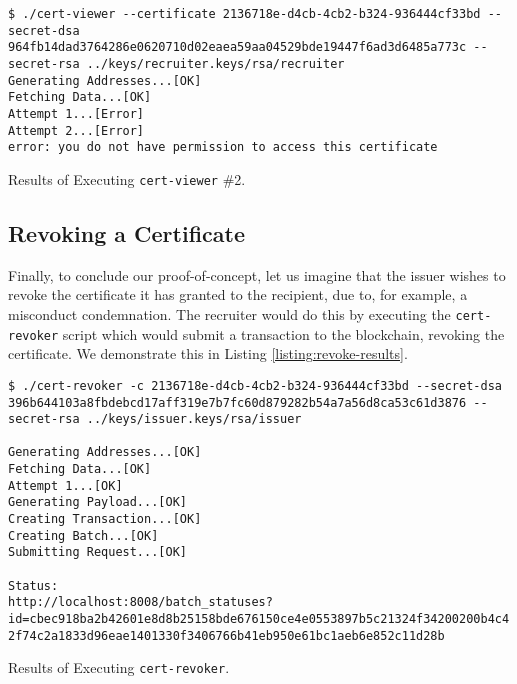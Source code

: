 \begin{listing}[ht]
	\begin{verbatim}
$ ./cert-viewer --certificate 2136718e-d4cb-4cb2-b324-936444cf33bd --secret-dsa 964fb14dad3764286e0620710d02eaea59aa04529bde19447f6ad3d6485a773c --secret-rsa ../keys/recruiter.keys/rsa/recruiter
Generating Addresses...[OK]
Fetching Data...[OK]
Attempt 1...[Error]
Attempt 2...[Error]
error: you do not have permission to access this certificate
\end{verbatim}
	\caption{Results of Executing \texttt{cert-viewer} \#2.}
	\label{listing:view-recruiter-revoke-results}
\end{listing}

\subsection{Revoking a Certificate}
\label{sec:impl-revoke}

Finally, to conclude our proof-of-concept, let us imagine that the issuer wishes to revoke the certificate it has granted to the recipient, due to, for example, a misconduct condemnation. The recruiter would do this by executing the \texttt{cert-revoker} script which would submit a transaction to the blockchain, revoking the certificate. We demonstrate this in Listing \ref{listing:revoke-results}.

\begin{listing}[ht]
	\begin{verbatim}
$ ./cert-revoker -c 2136718e-d4cb-4cb2-b324-936444cf33bd --secret-dsa 396b644103a8fbdebcd17aff319e7b7fc60d879282b54a7a56d8ca53c61d3876 --secret-rsa ../keys/issuer.keys/rsa/issuer

Generating Addresses...[OK]
Fetching Data...[OK]
Attempt 1...[OK]
Generating Payload...[OK]
Creating Transaction...[OK]
Creating Batch...[OK]
Submitting Request...[OK]

Status:
http://localhost:8008/batch_statuses?id=cbec918ba2b42601e8d8b25158bde676150ce4e0553897b5c21324f34200200b4c4
2f74c2a1833d96eae1401330f3406766b41eb950e61bc1aeb6e852c11d28b

\end{verbatim}
	\caption{Results of Executing \texttt{cert-revoker}.}
	\label{listing:revoke-results}
\end{listing}

